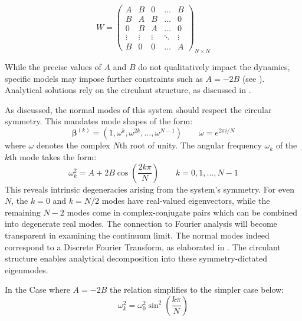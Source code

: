\documentclass[final,5p,times,twocolumn,authoryear]{elsarticle}
\begin{document}
\begin{equation}
	W =
	\begin{pmatrix}
		A & B & 0 & \dots & B \\
		B & A & B & \dots & 0 \\
		
		0 & B & A & \dots & 0 \\
		\vdots & \vdots & \vdots & \ddots & \vdots \\
		B & 0 & 0 & \dots & A
	\end{pmatrix}_{N \times N}
	\label{eq-Wcirculant}	
\end{equation}

While the precise values of $A$ and $B$ do not qualitatively impact the dynamics, specific models may impose further constraints such as $A = -2B$ (see \cite{georgiPhysicsWaves2015}). Analytical solutions rely on the circulant structure, as discussed in \cite{grayToeplitzCirculantMatrices2006}.

As discussed, the normal modes of this system should respect the circular symmetry. This mandates mode shapes of the form:
\begin{equation*}
	\bm{\beta}^{(k)} = \left(1, \omega^k, \omega^{2k},\dots, \omega^{N-1}\right) \qquad \omega = e^{2\pi i/N}
\end{equation*}  
where $\omega$ denotes the complex $N$th root of unity. The angular frequency $\omega_k$ of the $k$th mode takes the form:
\[ \omega_k^2=A + 2B\cos\left(\frac{2k\pi}{N}\right) \qquad k = 0,1,\dots, N-1 \]
This reveals intrinsic degeneracies arising from the system's symmetry. For even $N$, the $k=0$ and $k=N/2$ modes have real-valued eigenvectors, while the remaining $N-2$ modes come in complex-conjugate pairs which can be combined into degenerate real modes. The connection to Fourier analysis will become transparent in examining the continuum limit. The normal modes indeed correspond to a Discrete Fourier Transform, as elaborated in \cite{grayToeplitzCirculantMatrices2006}. The circulant structure enables analytical decomposition into these symmetry-dictated eigenmodes.

In the Case where $A=-2B $ the relation simplifies to the simpler case below:
\[ \omega_k^2 = \omega_0^2\sin^2\left(\frac{k\pi}{N}\right) \]
\end{document}
